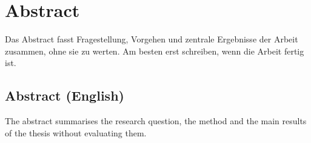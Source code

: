 \chapter*{Abstract}
\begin{otherlanguage}{ngerman}
Das Abstract fasst Fragestellung, Vorgehen und zentrale Ergebnisse der Arbeit
zusammen, ohne sie zu werten. Am besten erst schreiben, wenn die Arbeit fertig ist.
\end{otherlanguage}

\section*{Abstract (English)}
\begin{otherlanguage}{english}
The abstract summarises the research question, the method and the main results
of the thesis without evaluating them.
\end{otherlanguage}
